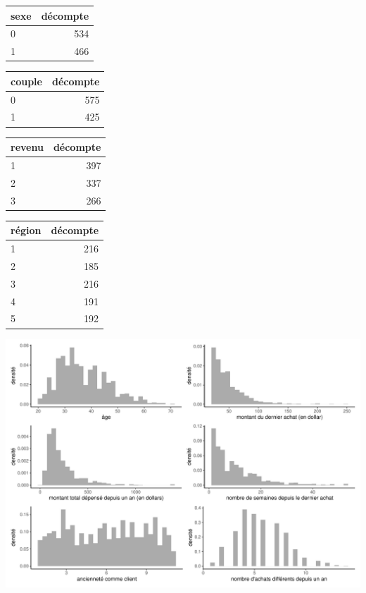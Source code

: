 \documentclass[
  ignorenonframetext,
]{beamer}
\begin{document}
\begin{frame}
\begin{table}

\begin{tabular}{lr}
\toprule
sexe & décompte\\
\midrule
0 & 534\\
1 & 466\\
\bottomrule
\end{tabular}
\begin{tabular}{lr}
\toprule
couple & décompte\\
\midrule
0 & 575\\
1 & 425\\
\bottomrule
\end{tabular}
\end{table}

\begin{table}

\begin{tabular}{lr}
\toprule
revenu & décompte\\
\midrule
1 & 397\\
2 & 337\\
3 & 266\\
\bottomrule
\end{tabular}
\begin{tabular}{lr}
\toprule
région & décompte\\
\midrule
1 & 216\\
2 & 185\\
3 & 216\\
4 & 191\\
5 & 192\\
\bottomrule
\end{tabular}
\end{table}
\end{frame}

\begin{frame}
\includegraphics[width=1\textwidth,height=\textheight]{MATH60602-diapos5_files/figure-beamer/histogrammes-eda-dbm-fig-1.pdf}
\end{frame}
\end{document}
